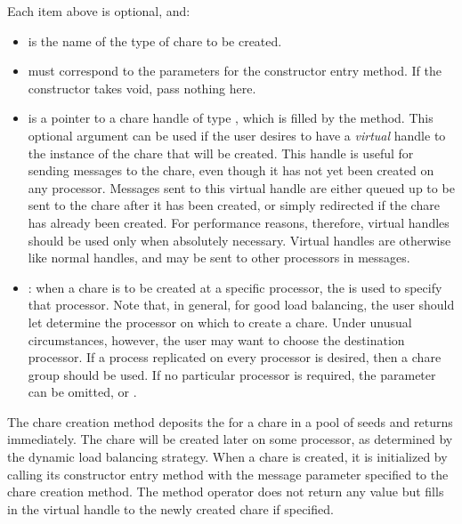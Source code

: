 Each item above is optional, and:

\begin{itemize}

\item {} is the name of the type of chare to be
created.

\item {} must correspond to the parameters for the constructor entry method.  If the constructor takes void, 
pass nothing here.

\item {} is a pointer to a chare handle of type
, which is filled by the  method. This optional
argument can be used if the user desires to have a {\em virtual} handle
 to the instance of the chare that will be
created. This handle is useful for sending messages to the
chare, even though it has not yet been created on any processor.
Messages sent to this virtual handle are either queued up to be sent to the
chare after it has been created, or simply redirected if the
chare has already been created. For performance reasons,
therefore, virtual handles should be used only when absolutely necessary.
Virtual handles are otherwise like normal handles, and may be
sent to other processors in messages.  

\item {}: when a chare is to be created at a specific
processor, the  is used to specify that processor.  Note that, in
general, for good load balancing, the user should let
\charmpp{} determine the processor on which to create a chare.
Under unusual circumstances, however, the user may want to choose the
destination processor.  If a process replicated on every processor is desired,
then a chare group should be used.  If no particular
processor is required, the parameter can be omitted, or .

\end{itemize}

The chare creation method deposits the  for
a chare in a pool of seeds and returns immediately. The chare will
be created later on some processor, as determined by the dynamic load balancing strategy. When a chare is created, it is
initialized by calling its   constructor entry method with the message parameter specified to the
chare creation method.  The method operator does not return any
value but fills in the virtual handle to the newly
created chare if specified.

